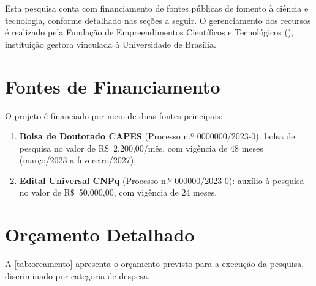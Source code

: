 
Esta pesquisa conta com financiamento de fontes públicas de fomento
à ciência e tecnologia, conforme detalhado nas seções a seguir. O
gerenciamento dos recursos é realizado pela Fundação de Empreendimentos
Científicos e Tecnológicos (), instituição gestora
vinculada à Universidade de Brasília.

\section{Fontes de Financiamento}

O projeto é financiado por meio de duas fontes principais:

\begin{enumerate}
  \item \textbf{Bolsa de Doutorado CAPES} (Processo n.º 0000000/2023-0):
        bolsa de pesquisa no valor de R\$~2.200,00/mês, com vigência de
        48 meses (março/2023 a fevereiro/2027);
  \item \textbf{Edital Universal CNPq} (Processo n.º 000000/2023-0):
        auxílio à pesquisa no valor de R\$~50.000,00, com vigência de
        24 meses.
\end{enumerate}

\section{Orçamento Detalhado}

A \autoref{tab:orcamento} apresenta o orçamento previsto para a execução
da pesquisa, discriminado por categoria de despesa.

